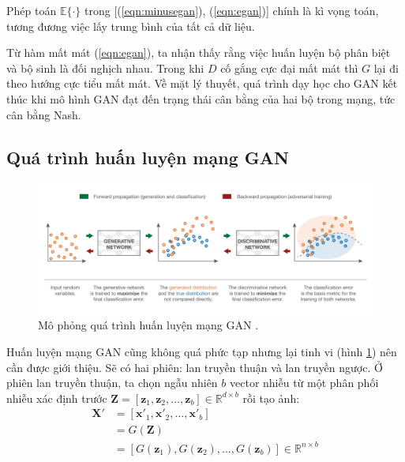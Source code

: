 \documentclass[a4paper, 12pt]{report}
\begin{document}
Phép toán $\mathbb{E}\{\cdot\}$ trong [(\ref{eqn:minusegan}), (\ref{eqn:egan})] chính là kì vọng toán, tương đương việc lấy trung bình của tất cả dữ liệu.\vspace{5pt}

Từ hàm mất mát (\ref{eqn:egan}), ta nhận thấy rằng việc huấn luyện bộ phân biệt và bộ sinh là đối nghịch nhau.
Trong khi $D$ cố gắng cực đại mất mát thì $G$ lại đi theo hướng cực tiểu mất mát.
Về mặt lý thuyết, quá trình dạy học cho GAN kết thúc khi mô hình GAN đạt đến trạng thái cân bằng của hai bộ trong mạng, tức cân bằng Nash.

\subsection{Quá trình huấn luyện mạng GAN}

\begin{figure}[!h]
\captionsetup{width=0.8\textwidth}
\centering
\includegraphics[width=16.5cm]{images/2_72.png}
\caption{Mô phỏng quá trình huấn luyện mạng GAN \cite{josephgan2019, josephroccagan}.}
\label{fig:forandbackgan}
\end{figure}

Huấn luyện mạng GAN cũng không quá phức tạp nhưng lại tinh vi (hình \ref{fig:forandbackgan}) nên cần được giới thiệu.
Sẽ có hai phiên: lan truyền thuận và lan truyền ngược.
Ở phiên lan truyền thuận, ta chọn ngẫu nhiên $b$ vector nhiễu từ một phân phối nhiễu xác định trước $\mathbf{Z} = \left[\mathbf{z}_1, \mathbf{z}_2, \dots, \mathbf{z}_b\right] \in \mathbb{R}^{d \times b}$ rồi tạo ảnh:
\begin{align}
    \mathbf{X'} &= \left[\mathbf{x'}_1, \mathbf{x'}_2, \dots, \mathbf{x'}_b\right]\nonumber\\
                &= G\left(\mathbf{Z}\right)\nonumber\\
                &= \left[G\left(\mathbf{z}_1\right), G\left(\mathbf{z}_2\right), \dots, G\left(\mathbf{z}_b\right)\right] \in \mathbb{R}^{n \times b}
\end{align}
\end{document}
